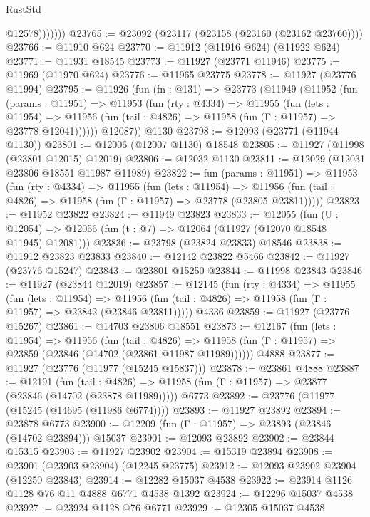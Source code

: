 \begin{lexlean}{RustStd}
\begin{coremodule}
                  @12578)))))))
@23765 := @23092 (@23117 (@23158 (@23160 (@23162 @23760))))
@23766 := @11910 @624
@23770 := @11912 (@11916 @624) (@11922 @624)
@23771 := @11931 @18545
@23773 := @11927 (@23771 @11946)
@23775 := @11969 (@11970 @624)
@23776 := @11965 @23775
@23778 := @11927 (@23776 @11994)
@23795 := @11926
    (fun (fn : @131) =>
    @23773
      (@11949
        (@11952
          (fun (params : @11951) =>
          @11953
            (fun (rty : @4334) =>
            @11955
              (fun (lets : @11954) =>
              @11956 (fun (tail : @4826) => @11958 (fun (Γ : @11957) => @23778 @12041))))))
        @12087))
    @1130
@23798 := @12093 (@23771 (@11944 @1130))
@23801 := @12006 (@12007 @1130) @18548
@23805 := @11927 (@11998 (@23801 @12015) @12019)
@23806 := @12032 @1130
@23811 := @12029 (@12031 @23806 @18551 @11987 @11989)
@23822 := fun (params : @11951) =>
  @11953
    (fun (rty : @4334) =>
    @11955
      (fun (lets : @11954) =>
      @11956 (fun (tail : @4826) => @11958 (fun (Γ : @11957) => @23778 (@23805 @23811)))))
@23823 := @11952 @23822
@23824 := @11949 @23823
@23833 := @12055
    (fun (U : @12054) => @12056 (fun (t : @7) => @12064 (@11927 (@12070 @18548 @11945) @12081)))
@23836 := @23798 (@23824 @23833) @18546
@23838 := @11912 @23823 @23833
@23840 := @12142 @23822 @5466
@23842 := @11927 (@23776 @15247)
@23843 := @23801 @15250
@23844 := @11998 @23843
@23846 := @11927 (@23844 @12019)
@23857 := @12145
    (fun (rty : @4334) =>
    @11955
      (fun (lets : @11954) =>
      @11956 (fun (tail : @4826) => @11958 (fun (Γ : @11957) => @23842 (@23846 @23811)))))
    @4336
@23859 := @11927 (@23776 @15267)
@23861 := @14703 @23806 @18551
@23873 := @12167
    (fun (lets : @11954) =>
    @11956
      (fun (tail : @4826) =>
      @11958 (fun (Γ : @11957) => @23859 (@23846 (@14702 (@23861 @11987 @11989))))))
    @4888
@23877 := @11927 (@23776 (@11977 (@15245 @15837)))
@23878 := @23861 @4888
@23887 := @12191
    (fun (tail : @4826) => @11958 (fun (Γ : @11957) => @23877 (@23846 (@14702 (@23878 @11989)))))
    @6773
@23892 := @23776 (@11977 (@15245 (@14695 (@11986 @6774))))
@23893 := @11927 @23892
@23894 := @23878 @6773
@23900 := @12209 (fun (Γ : @11957) => @23893 (@23846 (@14702 @23894))) @15037
@23901 := @12093 @23892
@23902 := @23844 @15315
@23903 := @11927 @23902
@23904 := @15319 @23894
@23908 := @23901 (@23903 @23904) (@12245 @23775)
@23912 := @12093 @23902 @23904 (@12250 @23843)
@23914 := @12282 @15037 @4538
@23922 := @23914 @1126 @1128 @76 @11 @4888 @6771 @4538 @1392
@23924 := @12296 @15037 @4538
@23927 := @23924 @1128 @76 @6771
@23929 := @12305 @15037 @4538

\end{coremodule}
\end{lexlean}
